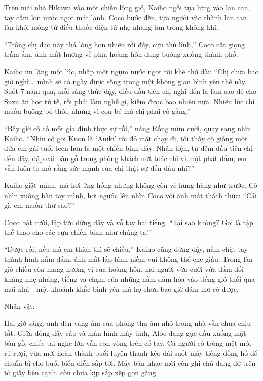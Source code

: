 \documentclass[../main.tex]{subfiles}
\begin{document}
Trên mái nhà Hikawa vào một chiều lộng gió, Kaiho ngồi tựa lưng vào lan can, tay cầm lon nước ngọt mát lạnh. Coco bước đến, tựa người vào thành lan can, làn khói mỏng từ điếu thuốc điện tử nhẹ nhàng tan trong không khí.

``Trông chị dạo này thả lỏng hơn nhiều rồi đấy, cựu thủ lĩnh,'' Coco cất giọng trầm ấm, ánh mắt hướng về phía hoàng hôn đang buông xuống thành phố.

Kaiho im lặng một lúc, nhấp một ngụm nước ngọt rồi khẽ thở dài: ``Chị chưa bao giờ nghĩ\dots\ mình sẽ có ngày được sống trong một không gian bình yên thế này. Suốt 7 năm qua, mỗi sáng thức dậy, điều đầu tiên chị nghĩ đến là làm sao để cho Suzu ăn học tử tế, rồi phải làm nghề gì, kiếm được bao nhiêu nữa. Nhiều lúc chỉ muốn buông bỏ thôi, nhưng vì con bé mà chị phải cố gắng.''

``Bây giờ cô có một gia đình thực sự rồi,'' nàng Rồng mỉm cười, quay sang nhìn Kaiho. ``Nhìn cô gọi Kuon là `Aniki' rồi đỏ mặt chạy đi, tôi thấy cô giống một đứa em gái tuổi teen hơn là một chiến binh đấy. Nhân tiện, từ đêm đầu tiên chị đến đây, đập cái bàn gỗ trong phòng khách nứt toác chỉ vì một phát đấm, em vẫn luôn tò mò rằng sức mạnh của chị thật sự đến đâu nhỉ?''

Kaiho giật mình, má hơi ửng hồng nhưng không còn vẻ hung hăng như trước. Cô nhìn xuống bàn tay mình, hơi ngước lên nhìn Coco với ánh mắt thách thức: ``Cái gì, em muốn thử sao?''

Coco bật cười, lập tức đứng dậy và vỗ tay hai tiếng. ``Tại sao không? Gọi là tập thể thao cho các cựu chiến binh như chúng ta!'' 

``Được rồi, nếu mà em thích thì sẽ chiều,'' Kaiho cũng đứng dậy, nắm chặt tay thành hình nắm đấm, ánh mắt lấp lánh niềm vui không thể che giấu. Trong làn gió chiều còn mang hương vị của hoàng hôn, hai người vừa cười vừa đấm đối kháng nhẹ nhàng, tiếng va chạm của những nắm đấm hòa vào tiếng gió thổi qua mái nhà - một khoảnh khắc bình yên mà họ chưa bao giờ dám mơ có được.

\newpage

\begin{center}
{\caviar\fontsize{12pt}{12pt}\selectfont Nhân vật:  }
\end{center}

Hai giờ sáng, ánh đèn vàng ấm của phòng thu âm nhỏ trong nhà vẫn chưa chịu tắt. Giữa đống dây cáp và màn hình máy tính, Aloe đang gục đầu xuống mặt bàn gỗ, chiếc tai nghe lớn vẫn còn vòng trên cổ tay. Cả người cô trông mệt mỏi rũ rượi, vừa mới hoàn thành buổi luyện thanh kéo dài suốt mấy tiếng đồng hồ để chuẩn bị cho buổi biểu diễn sắp tới. Mấy bản nhạc mới còn ghi chú dang dở trên tờ giấy bên cạnh, còn chưa kịp sắp xếp gọn gàng.
\end{document}
